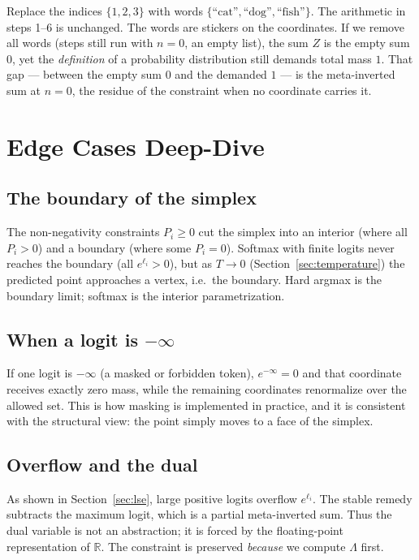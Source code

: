 \documentclass[11pt]{article}
\newcommand{\RR}{\mathbb{R}}
\begin{document}
Replace the indices $\{1,2,3\}$ with words $\{\text{``cat''},\text{``dog''},
\text{``fish''}\}$. The arithmetic in steps 1--6 is unchanged. The words are
stickers on the coordinates. If we remove all words (steps still run with
$n=0$, an empty list), the sum $Z$ is the empty sum $0$, yet the
\emph{definition} of a probability distribution still demands total mass $1$.
That gap --- between the empty sum $0$ and the demanded $1$ --- is the
meta-inverted sum at $n=0$, the residue of the constraint when no coordinate
carries it.

\section{Edge Cases Deep-Dive}
\label{sec:edge}

\subsection{The boundary of the simplex}
\label{sec:edge-boundary}

The non-negativity constraints $P_i\ge 0$ cut the simplex into an interior
(where all $P_i>0$) and a boundary (where some $P_i=0$). Softmax with finite
logits never reaches the boundary (all $e^{\ell_i}>0$), but as $T\to 0$
(Section~\ref{sec:temperature}) the predicted point approaches a vertex, i.e.\
the boundary. Hard argmax is the boundary limit; softmax is the interior
parametrization.

\subsection{When a logit is $-\infty$}
\label{sec:edge-neginf}

If one logit is $-\infty$ (a masked or forbidden token), $e^{-\infty}=0$ and
that coordinate receives exactly zero mass, while the remaining coordinates
renormalize over the allowed set. This is how masking is implemented in
practice, and it is consistent with the structural view: the point simply moves
to a face of the simplex.

\subsection{Overflow and the dual}
\label{sec:edge-overflow}

As shown in Section~\ref{sec:lse}, large positive logits overflow
$e^{\ell_i}$. The stable remedy subtracts the maximum logit, which is a partial
meta-inverted sum. Thus the dual variable is not an abstraction; it is forced by
the floating-point representation of $\RR$. The constraint is preserved
\emph{because} we compute $\Lambda$ first.
\end{document}
